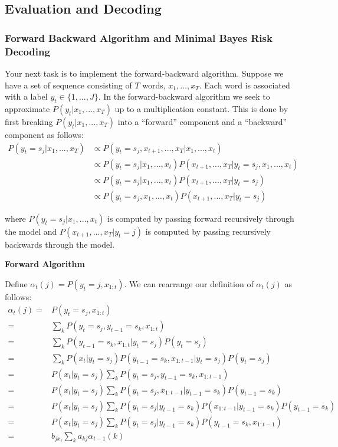\documentclass[11pt,addpoints,answers]{exam}
\numberwithin{equation}{section} %
\numberwithin{figure}{section} %
\numberwithin{table}{section} %
\begin{document}
\subsection{Evaluation and Decoding}
\label{forback}

\subsubsection{Forward Backward Algorithm and Minimal Bayes Risk Decoding}

Your next task is to implement the forward-backward algorithm. Suppose we have a set of sequence consisting of $T$ words, $x_1,...,x_T$. Each word is associated with a label $y_t\in\{1,...,J\}$. In the forward-backward algorithm we seek to approximate $P(y_t | x_1,...,x_T)$ up to a multiplication constant. This is done by first breaking $P(y_t | x_1,...,x_T)$ into a ``forward'' component and a ``backward'' component as follows:
\begin{align*}
   P(y_t =s_j | x_1,...,x_T) &\propto P(y_t=s_j,x_{t+1},...,x_T|x_1,...,x_{t})\\
   &\propto P(y_t=s_j|x_1,...,x_{t})P(x_{t+1},...,x_T|y_t=s_j, x_1,...,x_{t})\\
    &\propto P(y_t=s_j|x_1,...,x_{t})P(x_{t+1},...,x_T|y_t=s_j)\\ 
     &\propto P(y_t=s_j, x_1,...,x_{t})P(x_{t+1},...,x_T|y_t=s_j) 
\end{align*}

where $P(y_t=s_j|x_1,...,x_{t})$ is computed by passing forward recursively through the model and $P(x_{t+1},...,x_T|y_t=j)$ is computed by passing recursively backwards through the model.

\newpage
\textbf{Forward Algorithm}

Define $\alpha_t(j) = P(y_t = j, x_{1:t})$. We can rearrange our definition of $\alpha_t(j)$ as follows:
\begin{align}
    \label{eqn:alpha}
    \alpha_t(j)
    =&P(y_t=s_j, x_{1:t}) \nonumber\\
    =& \sum_{k} P(y_t=s_j, y_{t-1}=s_k, x_{1:t}) \nonumber\\
    =& \sum_{k} P(y_{t-1}=s_k, x_{1:t} \vert y_t = s_j) P(y_t = s_j) \nonumber\\
    =& \sum_{k} P(x_t \vert y_t = s_j) P(y_{t-1}=s_k, x_{1:t-1} \vert y_t = s_j) P(y_t = s_j) \nonumber\\
    =& P(x_t \vert y_t = s_j) \sum_{k} P(y_t = s_j, y_{t-1}=s_k, x_{1:t-1}) \nonumber\\
    =& P(x_t \vert y_t = s_j) \sum_{k} P(y_t = s_j, x_{1:t-1} \vert y_{t-1}=s_k) P(y_{t-1}=s_k) \nonumber\\
    =& P(x_t \vert y_t = s_j) \sum_{k} P(y_t = s_j \vert y_{t-1}=s_k) P(x_{1:t-1} \vert y_{t-1}=s_k) P(y_{t-1}=s_k) \nonumber\\
    =& P(x_t \vert y_t = s_j) \sum_{k} P(y_t = s_j \vert y_{t-1}=s_k) P(y_{t-1}=s_k, x_{1:t-1}) \nonumber\\
    =& b_{jx_t} \sum_{k} a_{kj} \alpha_{t-1}(k)
\end{align}
\end{document}
